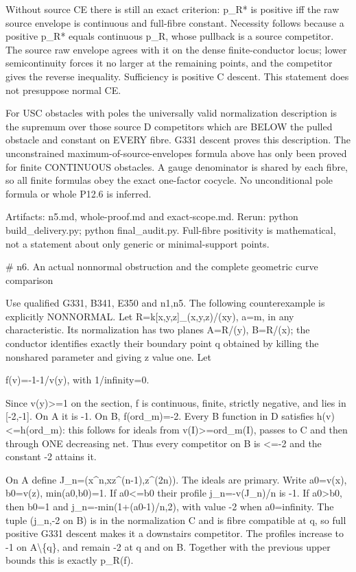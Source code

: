 \documentclass[11pt]{article}
\begin{document}
Without source CE there is still an exact criterion: p\_R* is positive iff the raw source envelope is continuous and full-fibre constant. Necessity follows because a positive p\_R* equals continuous p\_R, whose pullback is a source competitor. The source raw envelope agrees with it on the dense finite-conductor locus; lower semicontinuity forces it no larger at the remaining points, and the competitor gives the reverse inequality. Sufficiency is positive C descent. This statement does not presuppose normal CE.

For USC obstacles with poles the universally valid normalization description is the supremum over those source D competitors which are BELOW the pulled obstacle and constant on EVERY fibre. G331 descent proves this description. The unconstrained maximum-of-source-envelopes formula above has only been proved for finite CONTINUOUS obstacles. A gauge denominator is shared by each fibre, so all finite formulas obey the exact one-factor cocycle. No unconditional pole formula or whole P12.6 is inferred.

Artifacts: n5.md, whole-proof.md and exact-scope.md. Rerun: python build\_delivery.py; python final\_audit.py. Full-fibre positivity is mathematical, not a statement about only generic or minimal-support points.

 \# n6. An actual nonnormal obstruction and the complete geometric curve comparison

Use qualified G331, B341, E350 and n1,n5. The following counterexample is explicitly NONNORMAL. Let R=k[x,y,z]\_(x,y,z)/(xy), a=m, in any characteristic. Its normalization has two planes A=R/(y), B=R/(x); the conductor identifies exactly their boundary point q obtained by killing the nonshared parameter and giving z value one. Let

f(v)=-1-1/v(y), with 1/infinity=0.

Since v(y)>=1 on the section, f is continuous, finite, strictly negative, and lies in [-2,-1]. On A it is -1. On B, f(ord\_m)=-2. Every B function in D satisfies h(v)<=h(ord\_m): this follows for ideals from v(I)>=ord\_m(I), passes to C and then through ONE decreasing net. Thus every competitor on B is <=-2 and the constant -2 attains it.

On A define J\_n=(x\textasciicircum{}n,xz\textasciicircum{}(n-1),z\textasciicircum{}(2n)). The ideals are primary. Write a0=v(x), b0=v(z), min(a0,b0)=1. If a0<=b0 their profile j\_n=-v(J\_n)/n is -1. If a0>b0, then b0=1 and j\_n=-min(1+(a0-1)/n,2), with value -2 when a0=infinity. The tuple (j\_n,-2 on B) is in the normalization C and is fibre compatible at q, so full positive G331 descent makes it a downstairs competitor. The profiles increase to -1 on A\textbackslash{}\{q\}, and remain -2 at q and on B. Together with the previous upper bounds this is exactly p\_R(f).
\end{document}
